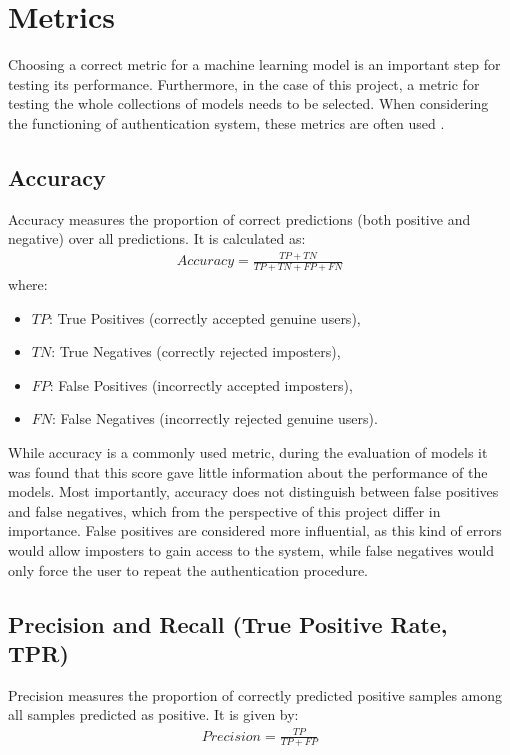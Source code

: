 \section{Metrics}
Choosing a correct metric for a machine learning model is an important step for testing its performance. Furthermore, in the case of this project, a metric for testing the whole collections of models needs to be selected.
When considering the functioning of authentication system, these metrics are often used \cite{traore2011continuous}. 

\subsection{Accuracy}
Accuracy measures the proportion of correct predictions (both positive and negative) over all predictions. It is calculated as:
\begin{align}
Accuracy = \frac{TP + TN}{TP + TN + FP + FN}
\end{align}
where:
\begin{itemize}
	\item $TP$: True Positives (correctly accepted genuine users),
	\item $TN$: True Negatives (correctly rejected imposters),
	\item $FP$: False Positives (incorrectly accepted imposters),
	\item $FN$: False Negatives (incorrectly rejected genuine users).
\end{itemize}

While accuracy is a commonly used metric, during the evaluation of models it was found that this score gave little information about the performance of the models. Most importantly, accuracy does not distinguish between false positives and false negatives, which from the perspective of this project differ in importance. False positives are considered more influential, as this kind of errors would allow imposters to gain access to the system, while false negatives would only force the user to repeat the authentication procedure.

\subsection{Precision and Recall (True Positive Rate, TPR)}
Precision measures the proportion of correctly predicted positive samples among all samples predicted as positive. It is given by:
\begin{align}
Precision = \frac{TP}{TP + FP}
\end{align}

